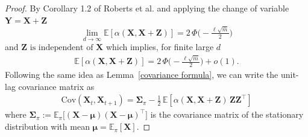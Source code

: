 \documentclass[conference]{IEEEtran}
\theoremstyle{definition}
\begin{document}
\begin{proof}
\noindent By Corollary 1.2 of Roberts et al. \cite{RobertsandGelman} and applying the change of variable \(\boldsymbol{Y}=\boldsymbol{X}+\boldsymbol{Z}\)
\[\lim_{d\to\infty}\mathbb{E}[\alpha(\boldsymbol{X},\boldsymbol{X}+\boldsymbol{Z})] =2\,\Phi\!\big(-\tfrac{\ell\sqrt{\bar m}}{2}\big)\] and \(\boldsymbol{Z}\text{ is independent of }\boldsymbol{X}\)
which implies, for finite large \(d\)
\begin{align}\label{Ealpha}
\mathbb{E}[\alpha(\boldsymbol{X},\boldsymbol{X}+\boldsymbol{Z})] =2\,\Phi\!\big(-\tfrac{\ell\sqrt{\bar m}}{2}\big)+o(1).
\end{align}
Following the same idea as Lemma~\ref{covariance formula}, we can write the unit-lag covariance matrix as
\begin{align}\label{formula high dim}
\mathrm{Cov}(\boldsymbol{X}_t,\boldsymbol{X}_{t+1})
= \boldsymbol \Sigma_{\pi}-\tfrac12\,\mathbb{E}[\alpha(\boldsymbol{X},\boldsymbol{X}+\boldsymbol{Z})\,\boldsymbol{Z}\boldsymbol{Z}^\top]
\end{align}
where $\boldsymbol\Sigma_{\pi}:=\mathbb{E}_{\pi}\!\big[(\boldsymbol{X}-\boldsymbol\mu)(\boldsymbol{X}-\boldsymbol\mu)^\top\big]$ is the covariance matrix of the stationary distribution with mean $\boldsymbol \mu=\mathbb{E}_{\pi}[\boldsymbol{X}]$.



\end{proof}
\end{document}
